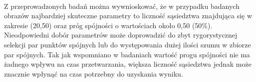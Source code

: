 \documentclass[../main.tex]{subfiles}
\begin{document}
    \paragraph{}
    Z przeprowadzonych badań można wywnioskować, że w przypadku badanych obrazów najbardziej skuteczne parametry to liczność sąsiedztwa znajdująca się w zakresie (20,50) oraz próg spójności o wartościach około 0,50 (50\%). Nieodpowiedni dobór parametrów może doprowadzić do zbyt rygorystycznej selekcji par punktów spójnych lub do występowania dużej ilości szumu w zbiorze par spójnych. Tak jak wspomniano w badaniach wartość progu spójności nie ma żadnego wpływu na czas przetwarzania, większa liczność sąsiedztwa jednak może znacznie wpłynąć na czas potrzebny do uzyskania wyniku.
    
\end{document}

